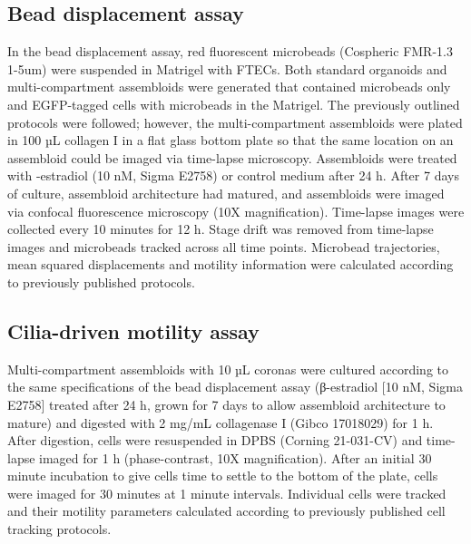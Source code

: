 \begin{refsection}
    \subsection{Bead displacement assay}
    In the bead displacement assay, red fluorescent microbeads (Cospheric FMR-1.3 1-5um) were suspended in Matrigel with FTECs. Both standard organoids and multi-compartment assembloids were generated that contained microbeads only and EGFP-tagged cells with microbeads in the Matrigel. The previously outlined protocols were followed; however, the multi-compartment assembloids were plated in 100 µL collagen I in a flat glass bottom plate so that the same location on an assembloid could be imaged via time-lapse microscopy. Assembloids were treated with \textbeta-estradiol\cite{garcia-alonso2021a} (10 nM, Sigma E2758) or control medium after 24 h. After 7 days of culture, assembloid architecture had matured, and assembloids were imaged via confocal fluorescence microscopy (10X magnification). Time-lapse images were collected every 10 minutes for 12 h. Stage drift was removed from time-lapse images and microbeads tracked across all time points. Microbead trajectories, mean squared displacements and motility information were calculated according to previously published protocols\cite{wu2015a}.
    
    \subsection{Cilia-driven motility assay}
    Multi-compartment assembloids with 10 µL coronas were cultured according to the same specifications of the bead displacement assay (β-estradiol [10 nM, Sigma E2758]\cite{garcia-alonso2021a} treated after 24 h, grown for 7 days to allow assembloid architecture to mature) and digested with 2 mg/mL collagenase I (Gibco 17018029) for 1 h. After digestion, cells were resuspended in DPBS (Corning 21-031-CV) and time-lapse imaged for 1 h (phase-contrast, 10X magnification). After an initial 30 minute incubation to give cells time to settle to the bottom of the plate, cells were imaged for 30 minutes at 1 minute intervals. Individual cells were tracked and their motility parameters calculated according to previously published cell tracking protocols\cite{wu2015a}.
    

\end{refsection}
